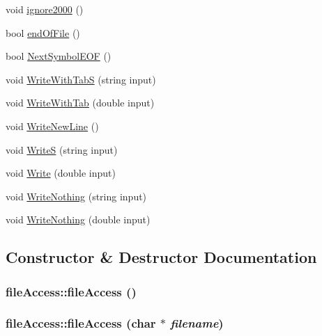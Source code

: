 \begin{DoxyCompactItemize}
void \hyperlink{classfile_access_a675e52ed0c98bb270f00e40ee9fad953}{ignore2000} ()
\item 
bool \hyperlink{classfile_access_a8a3b856426e1a903beaedf93585578f3}{endOfFile} ()
\item 
bool \hyperlink{classfile_access_a36f6e5fca88b48c20ce2d1839dc51589}{NextSymbolEOF} ()
\item 
void \hyperlink{classfile_access_a1be85b6ac39b2008402e56a4797bd76e}{WriteWithTabS} (string input)
\item 
void \hyperlink{classfile_access_a833e66cca1f4d94b7f9250333d198c75}{WriteWithTab} (double input)
\item 
void \hyperlink{classfile_access_a2c7465a2729dacc84a3701e997ffb320}{WriteNewLine} ()
\item 
void \hyperlink{classfile_access_a26ef28c6d48e3f4a88bd0197c6abeec0}{WriteS} (string input)
\item 
void \hyperlink{classfile_access_ab759f81ea15751aab3aa7ffc1bcb6162}{Write} (double input)
\item 
void \hyperlink{classfile_access_ac4de08bd121eadb157f295550c74dd99}{WriteNothing} (string input)
\item 
void \hyperlink{classfile_access_ab555c3549e0c4ee285a4f4b8c8867e4c}{WriteNothing} (double input)
\end{DoxyCompactItemize}


\subsection{Constructor \& Destructor Documentation}
\hypertarget{classfile_access_aa112e7752992f91e0618d2f248fdfe84}{
\subsubsection[{fileAccess}]{\setlength{\rightskip}{0pt plus 5cm}fileAccess::fileAccess ()}}
\label{classfile_access_aa112e7752992f91e0618d2f248fdfe84}
\hypertarget{classfile_access_a0cecedbce3972f8a5f8b8978636a3762}{
\subsubsection[{fileAccess}]{\setlength{\rightskip}{0pt plus 5cm}fileAccess::fileAccess (char $\ast$ {\em filename})}}
\label{classfile_access_a0cecedbce3972f8a5f8b8978636a3762}


